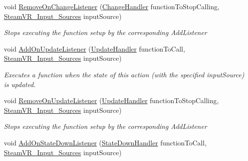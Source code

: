 \begin{DoxyCompactItemize}
void \mbox{\hyperlink{class_valve_1_1_v_r_1_1_steam_v_r___action___boolean_ac298fc72527d85d9331a214ac08113ed}{Remove\+On\+Change\+Listener}} (\mbox{\hyperlink{class_valve_1_1_v_r_1_1_steam_v_r___action___boolean_a9dbdff089d05d822688005fa19fef120}{Change\+Handler}} function\+To\+Stop\+Calling, \mbox{\hyperlink{namespace_valve_1_1_v_r_a82e5bf501cc3aa155444ee3f0662853f}{Steam\+V\+R\+\_\+\+Input\+\_\+\+Sources}} input\+Source)
\begin{DoxyCompactList}\small\item\em Stops executing the function setup by the corresponding Add\+Listener \end{DoxyCompactList}\item 
void \mbox{\hyperlink{class_valve_1_1_v_r_1_1_steam_v_r___action___boolean_a9cf9ddb16979e031c2f4a6f83da82830}{Add\+On\+Update\+Listener}} (\mbox{\hyperlink{class_valve_1_1_v_r_1_1_steam_v_r___action___boolean_ab9ee21a88a5d5d23603465c55796fcf5}{Update\+Handler}} function\+To\+Call, \mbox{\hyperlink{namespace_valve_1_1_v_r_a82e5bf501cc3aa155444ee3f0662853f}{Steam\+V\+R\+\_\+\+Input\+\_\+\+Sources}} input\+Source)
\begin{DoxyCompactList}\small\item\em Executes a function when the state of this action (with the specified input\+Source) is updated. \end{DoxyCompactList}\item 
void \mbox{\hyperlink{class_valve_1_1_v_r_1_1_steam_v_r___action___boolean_a25fd219a2b7375d1182cedf9922dd2b1}{Remove\+On\+Update\+Listener}} (\mbox{\hyperlink{class_valve_1_1_v_r_1_1_steam_v_r___action___boolean_ab9ee21a88a5d5d23603465c55796fcf5}{Update\+Handler}} function\+To\+Stop\+Calling, \mbox{\hyperlink{namespace_valve_1_1_v_r_a82e5bf501cc3aa155444ee3f0662853f}{Steam\+V\+R\+\_\+\+Input\+\_\+\+Sources}} input\+Source)
\begin{DoxyCompactList}\small\item\em Stops executing the function setup by the corresponding Add\+Listener \end{DoxyCompactList}\item 
void \mbox{\hyperlink{class_valve_1_1_v_r_1_1_steam_v_r___action___boolean_a6c3868c8ed0752981b0814021f26c7cb}{Add\+On\+State\+Down\+Listener}} (\mbox{\hyperlink{class_valve_1_1_v_r_1_1_steam_v_r___action___boolean_a529f46e4f0459edb2641bbb382d10614}{State\+Down\+Handler}} function\+To\+Call, \mbox{\hyperlink{namespace_valve_1_1_v_r_a82e5bf501cc3aa155444ee3f0662853f}{Steam\+V\+R\+\_\+\+Input\+\_\+\+Sources}} input\+Source)

\end{DoxyCompactItemize}
